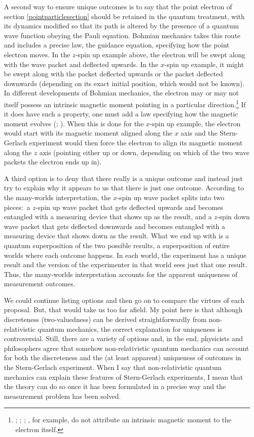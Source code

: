 \documentclass[12pt,secnumarabic,amsmath,amssymb,balancelastpage,nofootinbib]{article}
\begin{document}
A second way to ensure unique outcomes is to say that the point electron of section \ref{pointparticlesection} should be retained in the quantum treatment, with its dynamics modified so that its path is altered by the presence of a quantum wave function obeying the Pauli equation.  Bohmian mechanics takes this route and includes a precise law, the guidance equation, specifying how the point electron moves.  In the $z$-spin up example above, the electron will be swept along with the wave packet and deflected upwards. In the $x$-spin up example, it might be swept along with the packet deflected upwards or the packet deflected downwards (depending on its exact initial position, which would not be known).  In different developments of Bohmian mechanics, the electron may or may not itself possess an intrinsic magnetic moment pointing in a particular direction.\footnote{\citet[ch.\ 7]{albertQM}; \citet[ch.\ 10]{bohmhiley}; \citet[sec.\ 8.4]{durrtteufel}; \citet[pg.\ 346]{norsen2014}, for example, do not attribute an intrinsic magnetic moment to the electron itself.}  If it does have such a property, one must add a law specifying how the magnetic moment evolves (\citealp{dewdney1986}; \citealp[ch.\ 9]{holland}).  When this is done for the $x$-spin up example, the electron would start with its magnetic moment aligned along the $x$ axis and the Stern-Gerlach experiment would then force the electron to align its magnetic moment along the $z$ axis (pointing either up or down, depending on which of the two wave packets the electron ends up in).

A third option is to deny that there really is a unique outcome and instead just try to explain why it appears to us that there is just one outcome.  According to the many-worlds interpretation, the $x$-spin up wave packet splits into two pieces:\ a $z$-spin up wave packet that gets deflected upwards and becomes entangled with a measuring device that shows up as the result, and a $z$-spin down wave packet that gets deflected downwards and becomes entangled with a measuring device that shows down as the result.  What we end up with is a quantum superposition of the two possible results, a superposition of entire worlds where each outcome happens.  In each world, the experiment has a unique result and the version of the experimenter in that world sees just that one result.  Thus, the many-worlds interpretation accounts for the apparent uniqueness of measurement outcomes.

We could continue listing options and then go on to compare the virtues of each proposal.  But, that would take us too far afield.  My point here is that although discreteness (two-valuedness) can be derived straightforwardly from non-relativistic quantum mechanics, the correct explanation for uniqueness is controversial.  Still, there are a variety of options and, in the end, physicists and philosophers agree that somehow non-relativistic quantum mechanics can account for both the discreteness and the (at least apparent) uniqueness of outcomes in the Stern-Gerlach experiment.  When I say that non-relativistic quantum mechanics can explain these features of Stern-Gerlach experiments, I mean that the theory can do so once it has been formulated in a precise way and the measurement problem has been solved.
\end{document}
